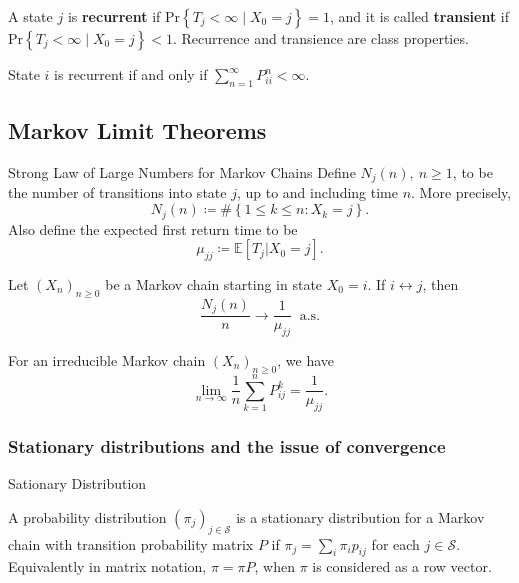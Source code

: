 \begin{idea}{}{}
    A state \( j \) is \textbf{recurrent} if \( \mathrm{Pr} \left\{ T_{j} < \infty  \mid  X _0 = j\right\}   = 1\), and it is called \textbf{transient} if \(  \mathrm{Pr} \left\{ T_{j} < \infty  \mid  X _0 = j\right\}   < 1 \). Recurrence and transience are class properties. 
\end{idea}

\begin{lem}{}{}
State \( i \) is recurrent if and only if \( \sum_{n = 1}^{\infty} P_{ii} ^n < \infty . \) 
\end{lem}

\subsection{Markov Limit Theorems}

\begin{thrm}{Strong Law of Large Numbers for Markov Chains}{}
Define \( N_{j} (n), \ n\geq 1 \), to be the number of transitions into state \( j \), up to and including time \( n \). More precisely, 
\[
    N_{j} (n)\coloneqq \# \left\{ 1\leq k\leq n: X_{k} = j \right\} . 
\]
Also define the expected first return time to be
\[
    \mu _{j j } \coloneqq \mathbb{E} [T_{j} |X_{0}= j ].
\]

Let \( (X_{n} )_{n\geq 0} \) be a Markov chain starting in state \( X_0 = i. \) If \( i \leftrightarrow j \), then
\[
\frac{    N_{j}(n)}{n} \to  \frac{1}{\mu _{j  j}} \ \text{ a.s.}
\] 
\end{thrm}

\begin{cor}{}{}
    For an irreducible Markov chain \( (X_{n} )_{n\geq 0} \),  we have
    \[
        \lim_{n \to \infty} \frac{1}{n}\sum_{k = 1}^n P_{ij}^k = \frac{1}{\mu _{j j }} . 
    \]
\end{cor}


\subsubsection{Stationary distributions and the issue of convergence}

\begin{defn}{Sationary Distribution}{}

    A probability distribution \( (\pi _{j} )_{j \in \mathcal{S}}  \) is a stationary distribution for a Markov chain with transition probability matrix \( P \) if \( \pi _{j}  = \sum_{i} \pi _{i} p _{ij}\) for each \( j \in \mathcal{S}  \). Equivalently in matrix notation, \( \pi  = \pi P\), when \( \pi    \) is considered as a row vector. 

\end{defn}

